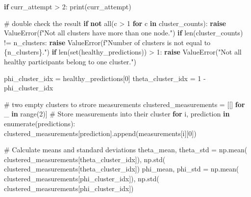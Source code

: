 \documentclass[
  letterpaper,
  DIV=11,
  numbers=noendperiod]{scrreprt}
\newenvironment{Shaded}{\begin{snugshade}}{\end{snugshade}}
\newcommand{\BuiltInTok}[1]{\textcolor[rgb]{0.00,0.23,0.31}{#1}}
\newcommand{\CommentTok}[1]{\textcolor[rgb]{0.37,0.37,0.37}{#1}}
\newcommand{\ControlFlowTok}[1]{\textcolor[rgb]{0.00,0.23,0.31}{\textbf{#1}}}
\newcommand{\DecValTok}[1]{\textcolor[rgb]{0.68,0.00,0.00}{#1}}
\newcommand{\KeywordTok}[1]{\textcolor[rgb]{0.00,0.23,0.31}{\textbf{#1}}}
\newcommand{\NormalTok}[1]{\textcolor[rgb]{0.00,0.23,0.31}{#1}}
\newcommand{\OperatorTok}[1]{\textcolor[rgb]{0.37,0.37,0.37}{#1}}
\newcommand{\PreprocessorTok}[1]{\textcolor[rgb]{0.68,0.00,0.00}{#1}}
\newcommand{\SpecialCharTok}[1]{\textcolor[rgb]{0.37,0.37,0.37}{#1}}
\newcommand{\SpecialStringTok}[1]{\textcolor[rgb]{0.13,0.47,0.30}{#1}}
\newcommand{\StringTok}[1]{\textcolor[rgb]{0.13,0.47,0.30}{#1}}
\begin{document}
\begin{Shaded}
\begin{Highlighting}[]
    \ControlFlowTok{if}\NormalTok{ curr\_attempt }\OperatorTok{\textgreater{}} \DecValTok{2}\NormalTok{:}
        \BuiltInTok{print}\NormalTok{(curr\_attempt)}

    \CommentTok{\# double check the result}
    \ControlFlowTok{if} \KeywordTok{not} \BuiltInTok{all}\NormalTok{(c }\OperatorTok{\textgreater{}} \DecValTok{1} \ControlFlowTok{for}\NormalTok{ c }\KeywordTok{in}\NormalTok{ cluster\_counts):}
        \ControlFlowTok{raise} \PreprocessorTok{ValueError}\NormalTok{(}\SpecialStringTok{f"Not all clusters have more than one node."}\NormalTok{)}
    \ControlFlowTok{if} \BuiltInTok{len}\NormalTok{(cluster\_counts) }\OperatorTok{!=}\NormalTok{ n\_clusters:}
        \ControlFlowTok{raise} \PreprocessorTok{ValueError}\NormalTok{(}\SpecialStringTok{f"Number of clusters is not equal to }\SpecialCharTok{\{}\NormalTok{n\_clusters}\SpecialCharTok{\}}\SpecialStringTok{."}\NormalTok{)}
    \ControlFlowTok{if} \BuiltInTok{len}\NormalTok{(}\BuiltInTok{set}\NormalTok{(healthy\_predictions)) }\OperatorTok{\textgreater{}} \DecValTok{1}\NormalTok{:}
        \ControlFlowTok{raise} \PreprocessorTok{ValueError}\NormalTok{(}\StringTok{"Not all healthy participants belong to one cluster."}\NormalTok{)}
    
\NormalTok{    phi\_cluster\_idx }\OperatorTok{=}\NormalTok{ healthy\_predictions[}\DecValTok{0}\NormalTok{]}
\NormalTok{    theta\_cluster\_idx }\OperatorTok{=} \DecValTok{1} \OperatorTok{{-}}\NormalTok{ phi\_cluster\_idx}

    \CommentTok{\# two empty clusters to strore measurements}
\NormalTok{    clustered\_measurements }\OperatorTok{=}\NormalTok{ [[] }\ControlFlowTok{for}\NormalTok{ \_ }\KeywordTok{in} \BuiltInTok{range}\NormalTok{(}\DecValTok{2}\NormalTok{)]}
    \CommentTok{\# Store measurements into their cluster}
    \ControlFlowTok{for}\NormalTok{ i, prediction }\KeywordTok{in} \BuiltInTok{enumerate}\NormalTok{(predictions):}
\NormalTok{        clustered\_measurements[prediction].append(measurements[i][}\DecValTok{0}\NormalTok{])}
    
     \CommentTok{\# Calculate means and standard deviations}
\NormalTok{    theta\_mean, theta\_std }\OperatorTok{=}\NormalTok{ np.mean(}
\NormalTok{        clustered\_measurements[theta\_cluster\_idx]), np.std(}
\NormalTok{            clustered\_measurements[theta\_cluster\_idx])}
\NormalTok{    phi\_mean, phi\_std }\OperatorTok{=}\NormalTok{ np.mean(}
\NormalTok{        clustered\_measurements[phi\_cluster\_idx]), np.std(}
\NormalTok{            clustered\_measurements[phi\_cluster\_idx])}
    

\end{Highlighting}
\end{Shaded}
\end{document}
